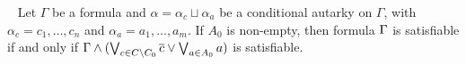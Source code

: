 %
%
%
%
%
%
%





\begin{theorem}~\label{thm:shrunkgbcequisat}
    Let $\Gamma$ be a formula and $\alpha = \alpha_c \sqcup \alpha_a$ be a
    conditional autarky on $\Gamma$, with $\alpha_c = c_1, \dots, c_n$ and
    $\alpha_a = a_1, \dots, a_m$. If $A_0$ is non-empty, then formula $\Gamma$
    is satisfiable if and only if $\Gamma \land (\bigvee_{c \in C \backslash
    C_0} \overline{c} \lor \bigvee_{a \in A_0} a)$ is satisfiable.
\end{theorem}

